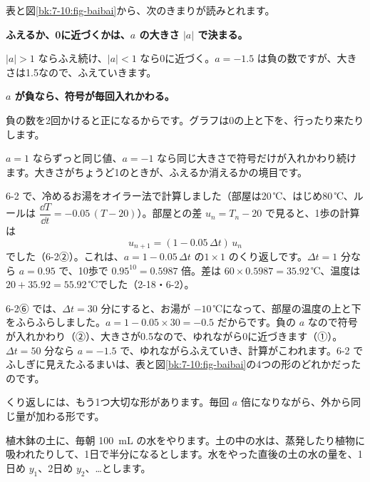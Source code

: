 表と図\ref{bk:7-10:fig-baibai}から、次のきまりが読みとれます。
\begin{enumerate}[label={\bkcircled[\bkTT]{\arabic*}}, leftmargin=2.4\zw, itemsep=2pt, topsep=2pt]
\item \textbf{ふえるか、0に近づくかは、$a$ の大きさ $|a|$ で決まる。}\par\noindent $|a|>1$ ならふえ続け、$|a|<1$ なら0に近づく。$a=-1.5$ は負の数ですが、大きさは1.5なので、ふえていきます。
\item \textbf{$a$ が負なら、符号が毎回入れかわる。}\par\noindent 負の数を2回かけると正になるからです。グラフは0の上と下を、行ったり来たりします。
\end{enumerate}
$a=1$ ならずっと同じ値、$a=-1$ なら同じ大きさで符号だけが入れかわり続けます。大きさがちょうど1のときが、ふえるか消えるかの境目です。

6-2 で、冷めるお湯をオイラー法で計算しました（部屋は20\,℃、はじめ80\,℃、ルールは $\dfrac{\dd T}{\dd t}=-0.05\,(T-20)$）。部屋との差 $u_n=T_n-20$ で見ると、1歩の計算は
\[ u_{n+1}=(1-0.05\,\Delta t)\,u_n \]
でした（6-2②）。これは、$a=1-0.05\,\Delta t$ の$1\times1$ のくり返しです。$\Delta t=1$ 分なら $a=0.95$ で、10歩で $0.95^{10}=0.5987$ 倍。差は $60\times0.5987=35.92$\,℃、温度は $20+35.92=55.92$\,℃でした（2-18・6-2）。

6-2⑥ では、$\Delta t=30$ 分にすると、お湯が $-10$\,℃になって、部屋の温度の上と下をふらふらしました。$a=1-0.05\times30=-0.5$ だからです。負の $a$ なので符号が入れかわり（②）、大きさが0.5なので、ゆれながら0に近づきます（①）。$\Delta t=50$ 分なら $a=-1.5$ で、ゆれながらふえていき、計算がこわれます。6-2 でふしぎに見えたふるまいは、表と図\ref{bk:7-10:fig-baibai}の4つの形のどれかだったのです。


\label{bk:7-10:kyusu}くり返しには、もう1つ大切な形があります。毎回 $a$ 倍になりながら、外から同じ量が加わる形です。

\noindent\begin{minipage}[c]{0.66\linewidth}\raggedright
植木鉢の土に、毎朝 \qty{100}{mL} の水をやります。土の中の水は、蒸発したり植物に吸われたりして、1日で半分になるとします。水をやった直後の土の水の量を、1日め $y_1$、2日め $y_2$、…とします。
\end{minipage}\hfill
\begin{minipage}[c]{0.3\linewidth}\centering
{}
\end{minipage}

